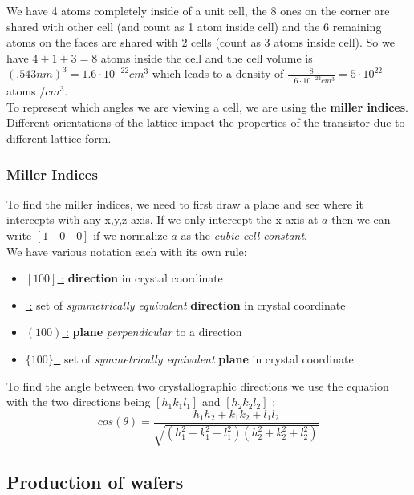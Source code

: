 \documentclass[
]{article}
\begin{document}
We have 4 atoms completely inside of a unit cell, the 8 ones on the
corner are shared with other cell (and count as 1 atom inside cell) and
the 6 remaining atoms on the faces are shared with 2 cells (count as 3
atoms inside cell). So we have \(4+1+3=8\) atoms inside the cell and the
cell volume is \((.543 nm)^3 = 1.6 \cdot10^{-22} cm^3\) which leads to a
density of \(\frac{8}{1.6 \cdot10^{-22} cm^3} = 5 \cdot 10^{22}\) atoms
\(/cm^3\).\\
To represent which angles we are viewing a cell, we are using the
\textbf{miller indices}. Different orientations of the lattice impact
the properties of the transistor due to different lattice form.

\hypertarget{miller-indices}{%
\subsubsection{Miller Indices}\label{miller-indices}}

To find the miller indices, we need to first draw a plane and see where
it intercepts with any x,y,z axis. If we only intercept the x axis at
\(a\) then we can write \([1 \quad 0 \quad 0]\) if we normalize \(a\) as
the \emph{cubic cell constant}.\\
We have various notation each with its own rule:

\begin{itemize}
\item
  \ul{\([100]\) :} \textbf{direction} in crystal coordinate
\item
  \ul{\(<100>\) :} set of \emph{symmetrically equivalent}
  \textbf{direction} in crystal coordinate
\item
  \ul{\((100)\) :} \textbf{plane} \emph{perpendicular} to a direction
\item
  \ul{\(\{100\}\) :} set of \emph{symmetrically equivalent}
  \textbf{plane} in crystal coordinate
\end{itemize}

To find the angle between two crystallographic directions we use the
equation with the two directions being \([h_1k_1l_1]\) and
\([h_2k_2l_2]\) :
\[cos(\theta) = \frac{h_1 h_2+k_1k_2+l_1l_2}{\sqrt{(h_1^2+k_1^2+l_1^2)(h_2^2+k_2^2+l_2^2)}}\]

\hypertarget{production-of-wafers}{%
\subsection{Production of wafers}\label{production-of-wafers}}
\end{document}
